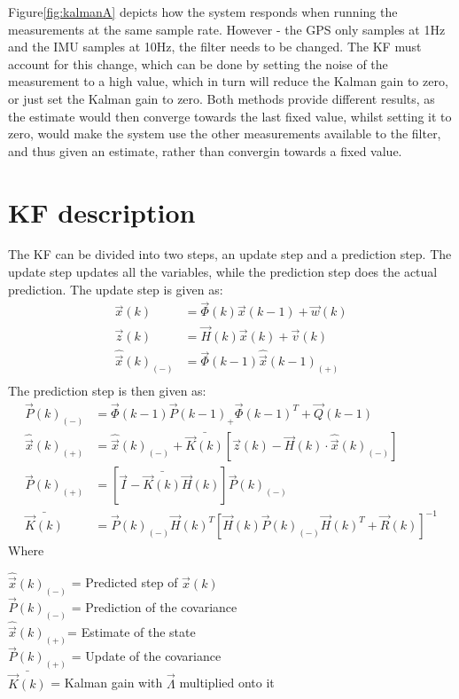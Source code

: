 Figure\vref{fig:kalmanA} depicts how the system responds when running the measurements at the same sample rate. However - the \ac{GPS} only samples at 1Hz and the \ac{IMU} samples at 10Hz, the filter needs to be changed. The \ac{KF} must account for this change, which can be done by setting the noise of the measurement to a high value, which in turn will reduce the Kalman gain  to zero, or just set the Kalman gain to zero. Both methods provide different results, as the estimate would then converge towards the last fixed value, whilst setting it to zero, would make the system use the other measurements available to the filter, and thus given an estimate, rather than convergin towards a fixed value. 	

\section{\ac{KF} description}
The \ac{KF} can be divided into two steps, an update step and a prediction step. The update step updates all the variables, while the prediction step does the actual prediction. The update step is given as:
\begin{align}
\vec{x}(k) &= \vec{\Phi}(k)\vec{x}(k-1) + \vec{w}(k)\\
\vec{z}(k) &= \vec{H}(k)\vec{x}(k) + \vec{v}(k)\\
\hat{\vec{x}}(k)_{(-)} &= \vec{\Phi}(k-1)\hat{\vec{x}}(k-1)_{(+)}\\
\end{align}
The prediction step is then given as:
\begin{align}
\vec{P}(k)_{(-)} &= \vec{\Phi}(k-1) \vec{P}(k-1)_+ \vec{\Phi}(k-1)^T + \vec{Q}(k-1)\\
\hat{\vec{x}}(k)_{(+)} &= \hat{\vec{x}}(k)_{(-)} + \bar{\vec{K}(k)}[\vec{z}(k) - \vec{H}(k)\cdot\hat{\vec{x}}(k)_{(-)}]\\
\vec{P}(k)_{(+)}&= [\vec{I} - \bar{\vec{K}(k)}\vec{H}(k)]\vec{P}(k)_{(-)}\\
\bar{\vec{K}(k)} &= \vec{P}(k)_{(-)} \vec{H}(k)^T [\vec{H}(k)\vec{P}(k)_{(-)} \vec{H}(k)^T + \vec{R}(k)]^{-1}
\end{align}
\noindent Where
\begin{ffk}
$\hat{\vec{x}}(k)_{(-)}$ = Predicted step of $\vec{x}(k)$\\
$\vec{P}(k)_{(-)}$ = Prediction of the covariance\\
$\hat{\vec{x}}(k)_{(+)}$= Estimate of the state\\
$\vec{P}(k)_{(+)}$ = Update of the covariance\\
$\bar{\vec{K}(k)}$ = Kalman gain with $\vec{\Lambda}$ multiplied onto it
\end{ffk}

